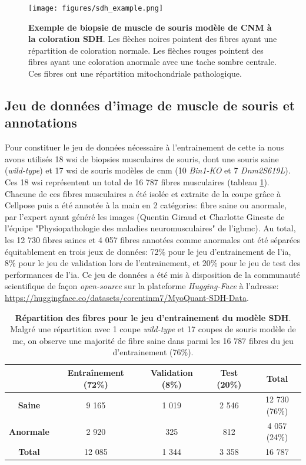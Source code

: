 \begin{figure}[!htbp]
 \centering
 \texttt{[image: figures/sdh\_example.png]}
 \caption[Exemple de biopsie musculaire à la coloration SDH]{\textbf{Exemple de biopsie de muscle de souris modèle de CNM à la coloration SDH}. Les flèches noires pointent des fibres ayant une répartition de coloration normale. Les flèches rouges pointent des fibres ayant une coloration anormale avec une tache sombre centrale. Ces fibres ont une répartition mitochondriale pathologique.}
 \label{fig:sdh_example}
\end{figure}
\subsection{Jeu de données d'image de muscle de souris et annotations}
Pour constituer le jeu de données nécessaire à l'entrainement de cette \gls{ia} nous avons utilisés 18 \gls{wsi} de biopsies musculaires de souris, dont une souris saine (\textit{wild-type}) et 17 \gls{wsi} de souris modèles de \gls{cnm} (10 \textit{Bin1-KO} et 7 \textit{Dnm2S619L}). Ces 18 \gls{wsi} représentent un total de 16 787 fibres musculaires (tableau \ref{tab:sdh_fiber_count}). Chacune de ces fibres musculaires a été isolée et extraite de la coupe grâce à Cellpose puis a été annotée à la main en 2 catégories: fibre saine ou anormale, par l'expert ayant généré les images (Quentin Giraud et Charlotte Gineste de l'équipe "Physiopathologie des maladies neuromusculaires" de l'\gls{igbmc}). Au total, les 12 730 fibres saines et 4 057 fibres annotées comme anormales ont été séparées équitablement en trois jeux de données: 72\% pour le jeu d'entrainement de l'\gls{ia}, 8\% pour le jeu de validation lors de l'entrainement, et 20\% pour le jeu de test des performances de l'\gls{ia}. Ce jeu de données a été mis à disposition de la communauté scientifique de façon \textit{open-source} sur la plateforme \textit{Hugging-Face} à l'adresse: \href{https://huggingface.co/datasets/corentinm7/MyoQuant-SDH-Data}{https://huggingface.co/datasets/corentinm7/MyoQuant-SDH-Data}.

\begin{table}[!htbp]
\centering
\caption[Répartition des fibres pour le jeu d'entrainement du modèle SDH]{\textbf{Répartition des fibres pour le jeu d'entrainement du modèle SDH}. Malgré une répartition avec 1 coupe \textit{wild-type} et 17 coupes de souris modèle de \gls{mc}, on observe une majorité de fibre saine dans parmi les 16 787 fibres du jeu d'entrainement (76\%).}
\label{tab:sdh_fiber_count}
\begin{tabular}{|c|c|c|c|c|}
\hline
 & \textbf{Entraînement} (72\%) & \textbf{Validation} (8\%) & \textbf{Test} (20\%) & \textbf{Total} \\
\hline
\textbf{Saine} & 9 165 & 1 019 & 2 546 & 12 730 (76\%) \\
\hline
\textbf{Anormale} & 2 920 & 325 & 812 & 4 057 (24\%) \\
\hline
\hline
\textbf{Total} & 12 085 & 1 344 & 3 358 & 16 787 \\
\hline
\end{tabular}
\end{table}


